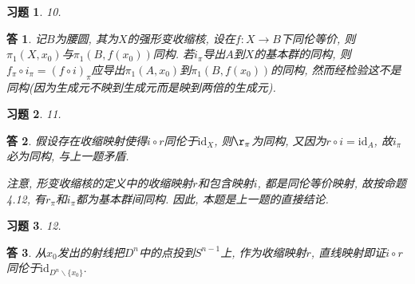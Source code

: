 \documentclass{ctexart}%
\newtheorem*{exercise}{习题}
\newtheorem*{solution}{答}
\theoremstyle{definition}
\theoremstyle{remark}
\begin{document}
\begin{exercise}10.
\end{exercise}
\begin{solution}
记$B$为腰圆, 其为$X$的强形变收缩核, 设在$f:X\rightarrow B$下同伦等价, 则$\pi_1(X,x_0)$与$\pi_1(B,f(x_0))$同构. 若$i_\pi$导出$A$到$X$的基本群的同构, 则$f_\pi\circ i_\pi = (f\circ i)_\pi$应导出$\pi_1(A,x_0)$到$\pi_1(B,f(x_0))$的同构, 然而经检验这不是同构(因为生成元不映到生成元而是映到两倍的生成元).
\end{solution}

\begin{exercise}11.
\end{exercise}
\begin{solution}
假设存在收缩映射使得$i\circ r$同伦于$\text{id}_X$, 则$\r_\pi$为同构, 又因为$r\circ i= \text{id}_A$, 故$i_\pi$必为同构, 与上一题矛盾.

注意, 形变收缩核的定义中的收缩映射$r$和包含映射$i$, 都是同伦等价映射, 故按命题4.12, 有$r_\pi$和$i_\pi$都为基本群间同构. 因此, 本题是上一题的直接结论.  
\end{solution}

\begin{exercise}12.
\end{exercise}
\begin{solution}
从$x_0$发出的射线把$D^n$中的点投到$S^{n-1}$上, 作为收缩映射$r$, 直线映射即证$i\circ r$同伦于$\text{id}_{D^n\backslash\{x_0\}}.$
\end{solution}
\end{document}
